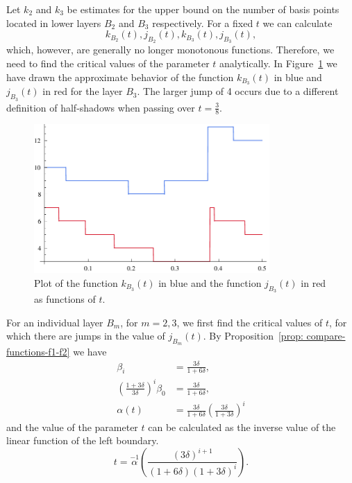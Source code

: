 Let $k_{2}$ and $k_{3}$ be estimates for the upper bound on the number of basis points located in lower layers $B_{2}$ and $B_{3}$ respectively. For a fixed $t$ we can calculate
$$
k_{B_{2}}(t),j_{B_{2}}(t),k_{B_{3}}(t),j_{B_{3}}(t),
$$
which, however, are generally no longer monotonous functions. Therefore, we need to find the critical values of the parameter $t$ analytically. In Figure~\ref{fig: lower-layer-kj} we have drawn the approximate behavior of the function $k_{B_{3}}(t)$ in blue and $j_{B_{3}}(t)$ in red for the layer $B_{3}$. The larger jump of 4 occurs due to a different definition of half-shadows when passing over $t = \frac{3}{8}$.

\begin{figure}
\centering
\includegraphics[width=0.8\textwidth]{./figures/lower-layer-kj.pdf}
\caption{Plot of the function $k_{B_{3}}(t)$ in blue and the function $j_{B_{3}}(t)$ in red as functions of $t$.}
\label{fig: lower-layer-kj}
\end{figure}

For an individual layer $B_{m}$, for $m = 2,3$, we first find the critical values of $t$, for which there are jumps in the value of $j_{B_{m}}(t)$. By Proposition~\ref{prop: compare-functions-f1-f2} we have
\begin{align*}
\beta_{i} &= \frac{3\delta}{1+6\delta}, \\[6pt]%
\left(\frac{1+3\delta}{3\delta}\right)^{i}\beta_{0} &= \frac{3\delta}{1+6\delta}, \\[6pt]%
\alpha(t) &= \frac{3\delta}{1+6\delta}\left(\frac{3\delta}{1+3\delta}\right)^{i}
\end{align*}
and the value of the parameter $t$ can be calculated as the inverse value of the linear function of the left boundary.
\begin{equation}
\label{eq: inverse}
t = \overset{-1}{\alpha}\left( \frac{\left(3\delta\right)^{i+1}}{(1+6\delta)\left(1+3\delta\right)^{i}} \right).
\end{equation}

